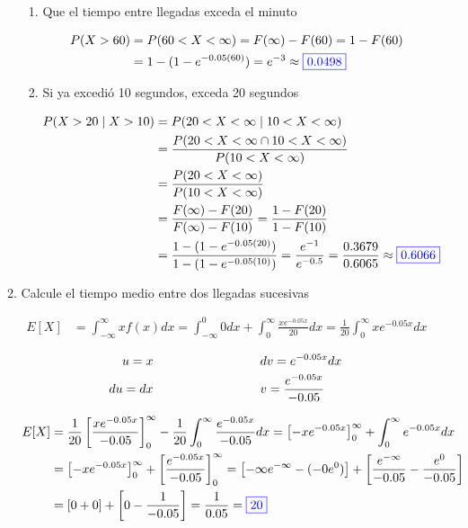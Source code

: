 \documentclass[12pt]{report}
\begin{document}
\begin{enumerate}
\begin{enumerate}[label=\alph*.]
    \begin{enumerate}[label=\alph*)]
      \item Que el tiempo entre llegadas exceda el minuto
      
      \begin{align*}
        P(X > 60) &= P(60 < X < \infty) = F(\infty) - F(60) = 1 - F(60) \\
        &= 1 - (1 - e^{-0.05(60)}) = e^{-3} \approx {\color{blue}\boxed{0.0498}}
      \end{align*}

      \item Si ya excedió 10 segundos, exceda 20 segundos
      
      \begin{align*}
        P(X > 20 \mid X > 10) &= P(20 < X < \infty \mid 10 < X < \infty) \\ 
        &= \frac{P(20 < X < \infty \cap 10 < X < \infty)}{P(10 < X < \infty)} \\
        &= \frac{P(20 < X < \infty)}{P(10 < X < \infty)} \\
        &= \frac{F(\infty) - F(20)}{F(\infty) - F(10)} = \frac{1 - F(20)}{1 - F(10)} \\
        &= \frac{1 - (1 - e^{-0.05(20)})}{1 - (1 - e^{-0.05(10)})} = \frac{e^{-1}}{e^{-0.5}} = \frac{0.3679}{0.6065} \approx {\color{blue}\boxed{0.6066}}
      \end{align*}
    \end{enumerate}

    \item Calcule el tiempo medio entre dos llegadas sucesivas

    \begin{align*}
      E[X] &= \int_{-\infty}^{\infty} xf(x)dx = \int_{-\infty}^0 0dx + \int_0^{\infty} \frac{xe^{-0.05x}}{20} dx = \frac{1}{20} \int_0^{\infty} xe^{-0.05x} dx 
    \end{align*}

    \begin{align*}
      u = x \hspace*{3cm} & dv = e^{-0.05x} dx \\
      du = dx \hspace*{3cm} & v = \frac{e^{-0.05x}}{-0.05} 
    \end{align*}

    \begin{align*}
      E[X] &= \frac{1}{20} \left[ \frac{xe^{-0.05x}}{-0.05} \right]_0^{\infty} - \frac{1}{20} \int_0^{\infty} \frac{e^{-0.05x}}{-0.05} dx = \left[ -xe^{-0.05x} \right]_0^\infty + \int_0^\infty e^{-0.05x} dx \\ 
      &= \left[ -xe^{-0.05x} \right]_0^\infty + \left[ \frac{e^{-0.05x}}{-0.05} \right]_0^\infty = \left[ -\infty e^{-\infty} - (-0e^0) \right] + \left[ \frac{e^{-\infty}}{-0.05} - \frac{e^0}{-0.05} \right] \\
      &= \left[ 0 + 0 \right] + \left[ 0 - \frac{1}{-0.05} \right] = \frac{1}{0.05} = {\color{blue}\boxed{20}}
    \end{align*}


\end{enumerate}
\end{enumerate}
\end{document}
